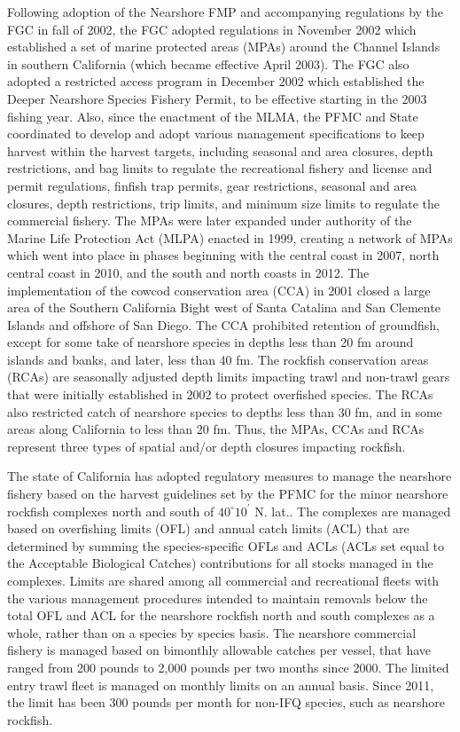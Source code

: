 \documentclass[11pt,
  letterpaper,
]{article}
\begin{document}
Following adoption of the Nearshore FMP and accompanying regulations by the FGC in fall of 2002, the FGC adopted regulations in November 2002 which established a set of marine protected areas (MPAs) around the Channel Islands in southern California (which became effective April 2003). The FGC also adopted a restricted access program in December 2002 which established the Deeper Nearshore Species Fishery Permit, to be effective starting in the 2003 fishing year. Also, since the enactment of the MLMA, the PFMC and State coordinated to develop and adopt various management specifications to keep harvest within the harvest targets, including seasonal and area closures, depth restrictions, and bag limits to regulate the recreational fishery and license and permit regulations, finfish trap permits, gear restrictions, seasonal and area closures, depth restrictions, trip limits, and minimum size limits to regulate the commercial fishery. The MPAs were later expanded under authority of the Marine Life Protection Act (MLPA) enacted in 1999, creating a network of MPAs which went into place in phases beginning with the central coast in 2007, north central coast in 2010, and the south and north coasts in 2012. The implementation of the cowcod conservation area (CCA) in 2001 closed a large area of the Southern California Bight west of Santa Catalina and San Clemente Islands and offshore of San Diego. The CCA prohibited retention of groundfish, except for some take of nearshore species in depths less than 20 fm around islands and banks, and later, less than 40 fm. The rockfish conservation areas (RCAs) are seasonally adjusted depth limits impacting trawl and non-trawl gears that were initially established in 2002 to protect overfished species. The RCAs also restricted catch of nearshore species to depths less than 30 fm, and in some areas along California to less than 20 fm. Thus, the MPAs, CCAs and RCAs represent three types of spatial and/or depth closures impacting rockfish.

The state of California has adopted regulatory measures to manage the nearshore fishery based on the harvest guidelines set by the PFMC for the minor nearshore rockfish complexes north and south of $40^\circ 10^\prime$ N. lat.. The complexes are managed based on overfishing limits (OFL) and annual catch limits (ACL) that are determined by summing the species-specific OFLs and ACLs (ACLs set equal to the Acceptable Biological Catches) contributions for all stocks managed in the complexes. Limits are shared among all commercial and recreational fleets with the various management procedures intended to maintain removals below the total OFL and ACL for the nearshore rockfish north and south complexes as a whole, rather than on a species by species basis. The nearshore commercial fishery is managed based on bimonthly allowable catches per vessel, that have ranged from 200 pounds to 2,000 pounds per two months since 2000. The limited entry trawl fleet is managed on monthly limits on an annual basis. Since 2011, the limit has been 300 pounds per month for non-IFQ species, such as nearshore rockfish.
\end{document}
